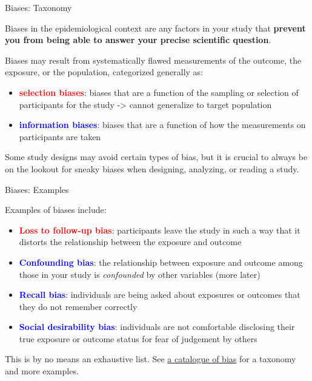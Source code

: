 \documentclass[ignorenonframetext,]{beamer}
\providecommand{\tightlist}{%
  \setlength{\itemsep}{0pt}\setlength{\parskip}{0pt}}
\begin{document}
\begin{frame}{Biases: Taxonomy}
\protect\hypertarget{biases-taxonomy}{}

Biases in the epidemiological context are any factors in your study that
\textbf{prevent you from being able to answer your precise scientific
question}.

Biases may result from systematically flawed measurements of the
outcome, the exposure, or the population, categorized generally as:

\begin{itemize}
\tightlist
\item
  \textbf{\textcolor{red}{selection biases}}: biases that are a function
  of the sampling or selection of participants for the study
  -\textgreater{} cannot generalize to target population
\item
  \textbf{\textcolor{blue}{information biases}}: biases that are a
  function of how the measurements on participants are taken
\end{itemize}

Some study designs may avoid certain types of bias, but it is crucial to
always be on the lookout for sneaky biases when designing, analyzing, or
reading a study.

\end{frame}

\begin{frame}{Biases: Examples}
\protect\hypertarget{biases-examples}{}

Examples of biases include:

\begin{itemize}
\tightlist
\item
  \textbf{\textcolor{red}{Loss to follow-up bias}}: participants leave
  the study in such a way that it distorts the relationship between the
  exposure and outcome
\item
  \textbf{\textcolor{blue}{Confounding bias}}: the relationship between
  exposure and outcome among those in your study is \emph{confounded} by
  other variables (more later)
\item
  \textbf{\textcolor{blue}{Recall bias}}: individuals are being asked
  about exposures or outcomes that they do not remember correctly
\item
  \textbf{\textcolor{blue}{Social desirability bias}}: individuals are
  not comfortable disclosing their true exposure or outcome status for
  fear of judgement by others
\end{itemize}

This is by no means an exhaustive list. See
\href{https://catalogofbias.org/biases/}{a catalogue of bias} for a
taxonomy and more examples.

\end{frame}
\end{document}
